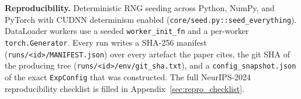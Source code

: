 \textbf{Reproducibility.}  Deterministic RNG seeding across Python,
NumPy, and PyTorch with CUDNN determinism enabled
(\texttt{core/seed.py::seed\_everything}).  DataLoader workers use a
seeded \texttt{worker\_init\_fn} and a per-worker
\texttt{torch.Generator}.  Every run writes a SHA-256 manifest
(\texttt{runs/<id>/MANIFEST.json}) over every artefact the paper
cites, the git SHA of the producing tree
(\texttt{runs/<id>/env/git\_sha.txt}), and a
\texttt{config\_snapshot.json} of the exact \texttt{ExpConfig} that
was constructed.  The full NeurIPS-2024 reproducibility checklist is
filled in Appendix~\ref{sec:repro_checklist}.
